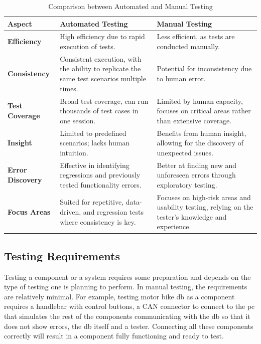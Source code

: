 \begin{table}[!ht]
\centering
\caption{Comparison between Automated and Manual Testing \cite{leloudas2023, shiwangi2014}}
\label{tab:comparison automated vs manual testing}
\begin{tabular}{|p{3cm}|p{6cm}|p{6cm}|}
\hline
\textbf{Aspect} & \textbf{Automated Testing} & \textbf{Manual Testing} \\ \hline
\textbf{Efficiency} & High efficiency due to rapid execution of tests. & Less efficient, as tests are conducted manually. \\ \hline
\textbf{Consistency} & Consistent execution, with the ability to replicate the same test scenarios multiple times. & Potential for inconsistency due to human error. \\ \hline
\textbf{Test Coverage} & Broad test coverage, can run thousands of test cases in one session. & Limited by human capacity, focuses on critical areas rather than extensive coverage. \\ \hline
\textbf{Insight} & Limited to predefined scenarios; lacks human intuition. & Benefits from human insight, allowing for the discovery of unexpected issues. \\ \hline
\textbf{Error Discovery} & Effective in identifying regressions and previously tested functionality errors. & Better at finding new and unforeseen errors through exploratory testing. \\ \hline
\textbf{Focus Areas} & Suited for repetitive, data-driven, and regression tests where consistency is key. & Focuses on high-risk areas and usability testing, relying on the tester's knowledge and experience. \\ \hline
\end{tabular}
\end{table}

\subsection{Testing Requirements}
Testing a component or a system requires some preparation and depends on the type of testing one is planning to perform. In manual testing, the requirements are relatively minimal. For example, testing motor bike \gls{db} as a component requires a handlebar with control buttons, a CAN connector to connect to the pc that simulates the rest of the components communicating with the \gls{db} so that it does not show errors, the \gls{db} itself and a tester. Connecting all these components correctly will result in a component fully functioning and ready to test.

